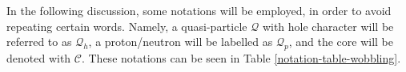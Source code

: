 In the following discussion, some notations will be employed, in order to avoid repeating certain words. Namely, a quasi-particle $\mathcal{Q}$ with hole character will be referred to as $\mathcal{Q}_h$, a proton/neutron will be labelled as $\mathcal{Q}_p$, and the core will be denoted with $\mathscr{C}$. These notations can be seen in Table \ref{notation-table-wobbling}.
\begin{table}
    \centering
    \caption{The notations used within the section which describe the QTR, typical for odd-$A$ nuclei.}
    \label{notation-table-wobbling}
\end{table}

